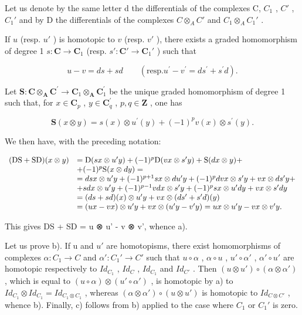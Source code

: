 Let us denote by the same letter d the differentials of the complexes C, \(C_{1}\) , \(C'\) , \(C_{1}'\) and by D the differentials of the complexes \(C \otimes_{A} C'\) and \(C_{1} \otimes_{A} C_{1}'\) .

If \(u\) (resp. \(u'\) ) is homotopic to \(v\) (resp. \(v'\) ), there exists a graded homomorphism of degree 1 \(s: \mathbf{C} \to \mathbf{C}_1\) (resp. \(s': \mathbf{C}' \to \mathbf{C}_1'\) ) such that

\[
u - v = d s + s d \qquad (\mathrm{resp.} u ^ {\prime} - v ^ {\prime} = d s ^ {\prime} + s ^ {\prime} d).\tag{2}
\]

Let \(\mathbf{S}:\mathbf{C}\otimes_{\mathbf{A}}\mathbf{C}^{\prime}\to \mathbf{C}_{1}\otimes_{\mathbf{A}}\mathbf{C}_{1}^{\prime}\) be the unique graded homomorphism of degree 1 such that, for \(x\in \mathbf{C}_p\) , \(y\in \mathbf{C}_q^\prime\) , \(p,q\in \mathbf{Z}\) , one has

\[
\mathbf {S} (x \otimes y) = s (x) \otimes u ^ {\prime} (y) + (- 1) ^ {p} v (x) \otimes s ^ {\prime} (y).\tag{3}
\]

We then have, with the preceding notation:

\[
\begin{array}{r l} (\mathrm{DS} + \mathrm{SD}) (x \otimes y) & = \mathrm{D} (s x \otimes u ^ {\prime} y) + (- 1) ^ {p} \mathrm{D} (v x \otimes s ^ {\prime} y) + \mathrm{S} (d x \otimes y) + \\ & + (- 1) ^ {p} \mathrm{S} (x \otimes d y) = \\ & = d s x \otimes u ^ {\prime} y + (- 1) ^ {p + 1} s x \otimes d u ^ {\prime} y + (- 1) ^ {p} d v x \otimes s ^ {\prime} y + v x \otimes d s ^ {\prime} y + \\ & + s d x \otimes u ^ {\prime} y + (- 1) ^ {p - 1} v d x \otimes s ^ {\prime} y + (- 1) ^ {p} s x \otimes u ^ {\prime} d y + v x \otimes s ^ {\prime} d y \\ & = (d s + s d) (x) \otimes u ^ {\prime} y + v x \otimes (d s ^ {\prime} + s ^ {\prime} d) (y) \\ & = (u x - v x) \otimes u ^ {\prime} y + v x \otimes (u ^ {\prime} y - v ^ {\prime} y) = u x \otimes u ^ {\prime} y - v x \otimes v ^ {\prime} y. \end{array}
\]

This gives DS + SD = u ⊗ u' - v ⊗ v', whence a).

Let us prove b). If u and \(u'\) are homotopisms, there exist homomorphisms of complexes \(\alpha: C_{1} \to C\) and \(\alpha': C_{1}' \to C'\) such that \(u \circ \alpha\) , \(\alpha \circ u\) , \(u' \circ \alpha'\) , \(\alpha' \circ u'\) are homotopic respectively to \(Id_{C_{1}}\) , \(Id_{C}\) , \(Id_{C_{1}}\) and \(Id_{C'}\) . Then \((u \otimes u') \circ (\alpha \otimes \alpha')\) , which is equal to \((u \circ \alpha) \otimes (u' \circ \alpha')\) , is homotopic by a) to \(Id_{C_{1}} \otimes Id_{C_{1}} = Id_{C_{1} \otimes C_{1}}\) , whereas \((\alpha \otimes \alpha') \circ (u \otimes u')\) is homotopic to \(Id_{C \otimes C'}\) , whence b). Finally, c) follows from b) applied to the case where \(C_{1}\) or \(C_{1}'\) is zero.

